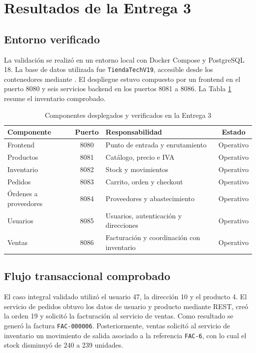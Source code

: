 \documentclass[12pt]{article}
\begin{document}
    \newpage

    \section{Resultados de la Entrega 3}

    \subsection{Entorno verificado}

    La validación se realizó en un entorno local con Docker Compose y PostgreSQL 18. La base de datos utilizada fue \texttt{TiendaTechV19}, accesible desde los contenedores mediante . El despliegue estuvo compuesto por un frontend en el puerto 8080 y seis servicios backend en los puertos 8081 a 8086. La Tabla \ref{tab:componentes_e3} resume el inventario comprobado.

    \begin{table}[H]
        \centering
        \caption{Componentes desplegados y verificados en la Entrega 3}
        \label{tab:componentes_e3}
        \small
        \begin{tabularx}{\textwidth}{X c X c}
\toprule
\textbf{Componente} & \textbf{Puerto} & \textbf{Responsabilidad} & \textbf{Estado} \\
\midrule
Frontend & 8080 & Punto de entrada y enrutamiento & Operativo \\
Productos & 8081 & Catálogo, precio e IVA & Operativo \\
Inventario & 8082 & Stock y movimientos & Operativo \\
Pedidos & 8083 & Carrito, orden y checkout & Operativo \\
Órdenes a proveedores & 8084 & Proveedores y abastecimiento & Operativo \\
Usuarios & 8085 & Usuarios, autenticación y direcciones & Operativo \\
Ventas & 8086 & Facturación y coordinación con inventario & Operativo \\
\bottomrule
        \end{tabularx}
    \end{table}

    \subsection{Flujo transaccional comprobado}

    El caso integral validado utilizó el usuario 47, la dirección 10 y el producto 4. El servicio de pedidos obtuvo los datos de usuario y producto mediante REST, creó la orden 19 y solicitó la facturación al servicio de ventas. Como resultado se generó la factura \texttt{FAC-000006}. Posteriormente, ventas solicitó al servicio de inventario un movimiento de salida asociado a la referencia \texttt{FAC-6}, con lo cual el stock disminuyó de 240 a 239 unidades.
\end{document}
